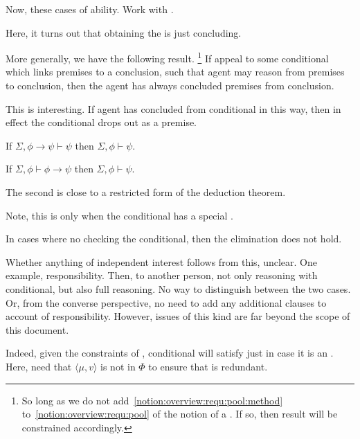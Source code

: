 \begin{note}
  Now, these cases of ability.
  Work with \adB{}.
\end{note}

\begin{note}
  Here, it turns out that obtaining the \itp{} is just concluding.
\end{note}

\begin{note}
  More generally, we have the following result.\nolinebreak
  \footnote{
    So long as we do not add~\autoref{notion:overview:requ:pool:method} to~\autoref{notion:overview:requ:pool} of the notion of a \requ{}.
    If so, then result will be constrained accordingly.
  }
  If appeal to some conditional which links premises to a conclusion, such that agent may reason from premises to conclusion, then the agent has always concluded premises from conclusion.

  This is interesting.
  If agent has concluded from conditional in this way, then in effect the conditional drops out as a premise.

  If \(\Sigma, \phi \rightarrow \psi \vdash \psi\) then \(\Sigma, \phi \vdash \psi\).

  If \(\Sigma, \phi \vdash \phi \rightarrow \psi\) then \(\Sigma, \phi \vdash \psi\).

  The second is close to a restricted form of the deduction theorem.

  Note, this is only when the conditional has a special \requ{}.

  In cases where no checking the conditional, then the elimination does not hold.

  Whether anything of independent interest follows from this, unclear.
  One example, responsibility.
  Then, to another person, not only reasoning with conditional, but also full reasoning.
  No way to distinguish between the two cases.
  Or, from the converse perspective, no need to add any additional clauses to account of responsibility.
  However, issues of this kind are far beyond the scope of this document.
\end{note}

\begin{note}
  Indeed, given the constraints of , conditional will satisfy just in case it is an \itp{}.
  Here, need that \(\langle \mu,v \rangle\) is not in \(\Phi\) to ensure that  is redundant.
\end{note}

